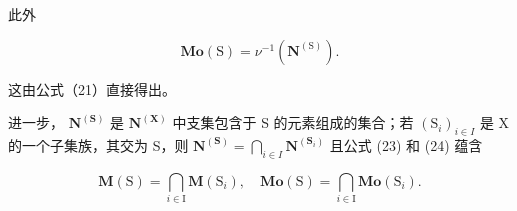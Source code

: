此外

\[
\mathbf {M o} (\mathrm{S}) = \nu^ {- 1} (\mathbf {N} ^ {(\mathrm{S})}).\tag{24}
\]

这由公式（21）直接得出。

进一步， \(\mathbf{N}^{(\mathbf{S})}\) 是 \(\mathbf{N}^{(\mathbf{X})}\) 中支集包含于 S 的元素组成的集合；若 \((\mathrm{S}_i)_{i\in I}\) 是 X 的一个子集族，其交为 S，则 \(\mathbf{N}^{(\mathbf{S})} = \bigcap_{i\in I}\mathbf{N}^{(\mathbf{S}_i)}\) 且公式 (23) 和 (24) 蕴含

\[
\mathbf {M} (\mathrm{S}) = \bigcap_ {i \in \mathrm{I}} \mathbf {M} (\mathrm{S} _ {i}), \quad \mathbf {M o} (\mathrm{S}) = \bigcap_ {i \in \mathrm{I}} \mathbf {M o} (\mathrm{S} _ {i}).\tag{25}
\]

